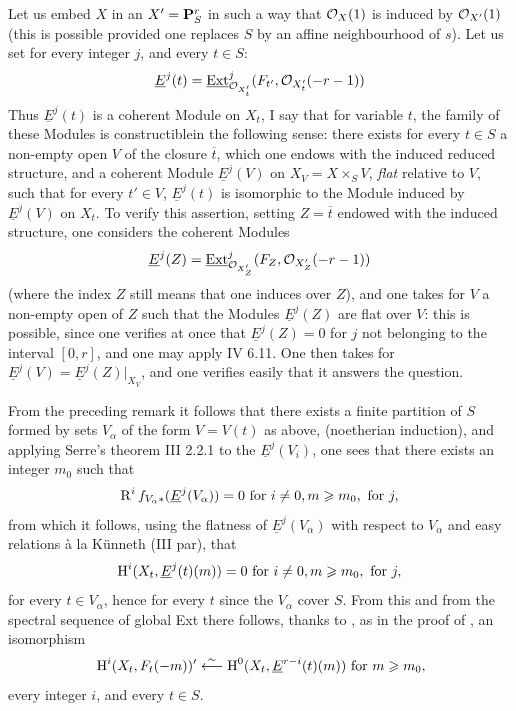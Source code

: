Let us embed $X$ in an $X'={\mathbf P}_S^r$ in such a way that $\mathcal{O}_X(1)$ is induced by ${\mathcal O}_{{X'}}(1)$ (this is possible provided one replaces $S$ by an affine neighbourhood of $s$). Let us set\label{P5} for every integer $j$, and every $t\in S$:
\steco
\begin{equation} \label{eq:XII.7} {}\underline{E}^j(t)= \operatorname{\underline{Ext}}^j_{{\mathcal O}_{X'_t}} (F_{t'}, {\mathcal O}_{X'_t}(-r-1))
\end{equation}
Thus $\underline{E}^j(t)$ is a coherent Module on $X_t$, I say that for variable $t$, the family of these Modules is \og constructible\fg in the following sense: there exists for every $t\in S$ a non-empty open $V$ of the closure $\overline{t}$, which one endows with the induced reduced structure, and a coherent Module $\underline{E}^j(V)$ on $X_V=X\times_SV$, \emph{flat} relative to $V$, such that for every $t'\in V$, $\underline{E}^j(t)$ is isomorphic to the Module induced by $\underline{E}^j(V)$ on $X_t$. To verify this assertion, setting $Z=\overline{t}$ endowed with the induced structure, one considers the coherent Modules
\[
\underline{E}^j(Z)= \operatorname{\underline{Ext}}^j_{{\mathcal O}_{X'_Z}} (F_Z, {\mathcal O}_{X'_Z}(-r-1))
\]
(where the index $Z$ still means that one induces over $Z$), and one takes for $V$ a non-empty open of $Z$ such that the Modules $\underline{E}^j(Z)$ are flat over $V$: this is possible, since one verifies at once that $\underline{E}^j(Z)=0$ for $j$ not belonging to the interval $[0, r]$, and one may apply  IV 6.11. One then takes for $\underline{E}^j(V)=\underline{E}^j(Z)|_{X_V}$, and one verifies easily that it answers the question.

From the preceding remark it follows that there exists a finite partition of $S$ formed by sets $V_\alpha$ of the form $V=V(t)$ as above, (noetherian induction), and applying Serre's theorem \EGA III 2.2.1 to the $\underline{E}^j(V_i)$, one sees that there exists an integer $m_0$ such that
\[
\operatorname{R}^if_{V_\alpha\ast}(\underline{E}^j(V_\alpha))=0\textup{ for } i\neq 0, m\geqslant m_0, \textup{ for }j,
\]
from which it follows, using the flatness of $\underline{E}^j(V_\alpha)$ with respect to $V_\alpha$ and easy relations \`a la Künneth (\cf \EGA III par), that
\[
\operatorname{H}^i(X_t, \underline{E}^j(t)(m))=0\textup{ for } i\neq 0, m\geqslant m_0, \textup{ for }j,
\]
for every $t\in V_\alpha$, hence for every $t$ since the $V_\alpha$ cover $S$. From this and from the spectral sequence of global Ext there follows, thanks to , as in the proof of , an isomorphism
\steco
\begin{equation} \label{eq:XII.8} {}\operatorname{H}^i(X_t, F_t(-m))' \overset{\sim}{\longleftarrow} \operatorname{H}^0(X_t, \underline{E}^{r-i}(t)(m))\textup{ for } m\geqslant m_0,
\end{equation}
every integer $i$, and every $t\in S$.

